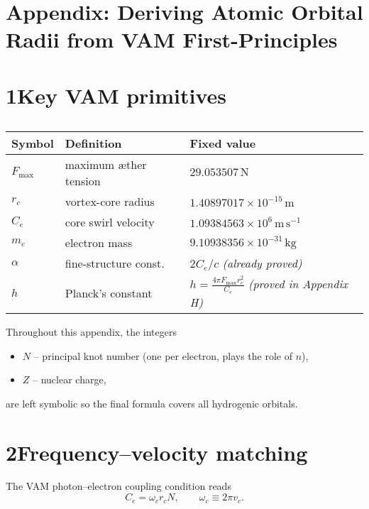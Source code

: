 \documentclass[11pt]{article}
\begin{document}
\section*{Appendix: Deriving Atomic Orbital Radii from VAM First-Principles}

\section*{1\quad Key VAM primitives}

\begin{table}[h]
    \centering
    \begin{tabular}{lll}
        \toprule
        \textbf{Symbol} & \textbf{Definition} & \textbf{Fixed value} \\
        \midrule
        $F_{\max}$ & maximum æther tension & $29.053507\,\text{N}$ \\
        $r_c$ & vortex-core radius & $1.40897017\times10^{-15}\,\text{m}$ \\
        $C_e$ & core swirl velocity & $1.09384563\times10^{6}\,\text{m}\,\text{s}^{-1}$ \\
        $m_e$ & electron mass & $9.10938356\times10^{-31}\,\text{kg}$ \\
        $\alpha$ & fine-structure const. & $2C_e/c$ \textit{(already proved)} \\
        $h$ & Planck’s constant & $\displaystyle h=\frac{4\pi F_{\max}r_c^{2}}{C_e}$ \textit{(proved in Appendix H)} \\
        \bottomrule
    \end{tabular}
    \caption{}
    \label{tab:primitives}
\end{table}

Throughout this appendix, the integers
\begin{itemize}
    \item $N$ -- principal knot number (one per electron, plays the role of $n$),
    \item $Z$ -- nuclear charge,
\end{itemize}
are left symbolic so the final formula covers all hydrogenic orbitals.

\section*{2\quad Frequency--velocity matching}

The VAM photon--electron coupling condition reads
\begin{equation}
    C_e = \omega_c r_c N, \qquad \omega_c \equiv 2\pi v_c.
\label{eq:match1}
\end{equation}
\end{document}
